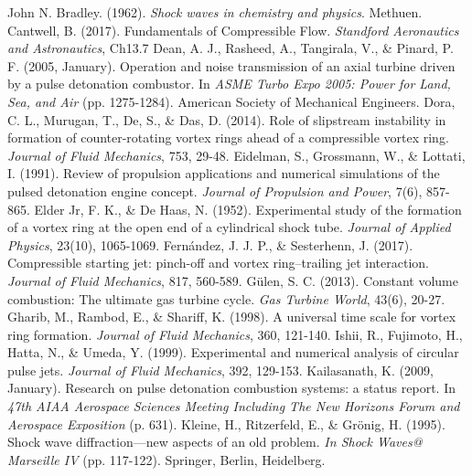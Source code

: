 \begin{thebibliography}{99}
	John N. Bradley. (1962). \textit{Shock waves in chemistry and physics}. Methuen.
	Cantwell, B. (2017).
	Fundamentals of Compressible Flow. \textit{Standford Aeronautics and Astronautics}, Ch13.7
	Dean, A. J., Rasheed, A., Tangirala, V., \& Pinard, P. F. (2005, January). Operation and noise transmission of an axial turbine driven by a pulse detonation combustor. In \textit{ASME Turbo Expo 2005: Power for Land, Sea, and Air} (pp. 1275-1284). American Society of Mechanical Engineers.
	Dora, C. L., Murugan, T., De, S., \& Das, D. (2014). Role of slipstream instability in formation of counter-rotating vortex rings ahead of a compressible vortex ring. \textit{Journal of Fluid Mechanics}, 753, 29-48.
	Eidelman, S., Grossmann, W., \& Lottati, I. (1991). Review of propulsion applications and numerical simulations of the pulsed detonation engine concept. \textit{Journal of Propulsion and Power}, 7(6), 857-865.
	Elder Jr, F. K., \& De Haas, N. (1952). Experimental study of the formation of a vortex ring at the open end of a cylindrical shock tube. \textit{Journal of Applied Physics}, 23(10), 1065-1069.
	Fernández, J. J. P., \& Sesterhenn, J. (2017). Compressible starting jet: pinch-off and vortex ring–trailing jet interaction. \textit{Journal of Fluid Mechanics}, 817, 560-589.
	G\"ulen, S. C. (2013). Constant volume combustion: The ultimate gas turbine cycle. \textit{Gas Turbine World}, 43(6), 20-27.
	Gharib, M., Rambod, E., \& Shariff, K. (1998). A universal time scale for vortex ring formation. \textit{Journal of Fluid Mechanics}, 360, 121-140.
	Ishii, R., Fujimoto, H., Hatta, N., \& Umeda, Y. (1999). Experimental and numerical analysis of circular pulse jets. \textit{Journal of Fluid Mechanics}, 392, 129-153.
	Kailasanath, K. (2009, January). Research on pulse detonation combustion systems: a status report. In \textit{47th AIAA Aerospace Sciences Meeting Including The New Horizons Forum and Aerospace Exposition} (p. 631).
	Kleine, H., Ritzerfeld, E., \& Grönig, H. (1995). Shock wave diffraction—new aspects of an old problem. \textit{In Shock Waves@ Marseille IV} (pp. 117-122). Springer, Berlin, Heidelberg.

\end{thebibliography}
